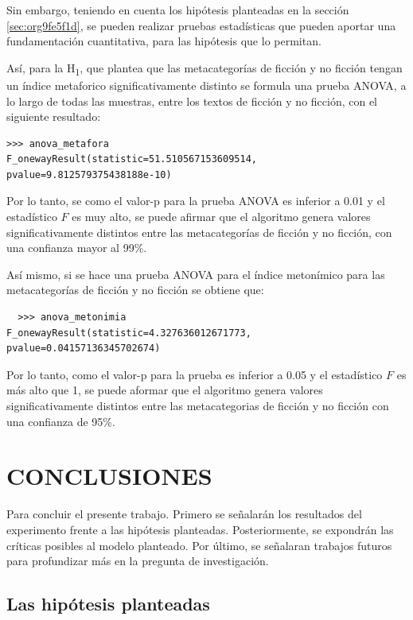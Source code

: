 \documentclass[12pt,letterpaper,twoside]{article}
\begin{document}
Sin embargo, teniendo en cuenta los hipótesis planteadas en la sección \ref{sec:org9fe5f1d},
se pueden realizar pruebas estadísticas que pueden aportar una fundamentación cuantitativa,
para las hipótesis que lo permitan.

Así, para la H\textsubscript{1}, que plantea que las metacategorías de ficción y no ficción tengan un
índice metaforico significativamente distinto se formula una prueba ANOVA, a lo largo de
todas las muestras, entre los textos de ficción y no ficción, con el siguiente resultado:

\begin{verbatim}
>>> anova_metafora
F_onewayResult(statistic=51.510567153609514, pvalue=9.812579375438188e-10)

\end{verbatim}

Por lo tanto, se como el valor-p para la prueba ANOVA es inferior a 0.01 y
el estadístico \(F\) es muy alto, se puede afirmar que el algoritmo genera valores
significativamente distintos entre las metacategorías de ficción y no ficción,
con una confianza mayor al 99\%.

Así mismo, si se hace una prueba ANOVA para el índice metonímico para las
metacategorías de ficción y no ficción se obtiene que:


\begin{verbatim}
  >>> anova_metonimia
F_onewayResult(statistic=4.327636012671773, pvalue=0.04157136345702674)

\end{verbatim}

Por lo tanto, como el valor-p para la prueba es inferior a 0.05 y el estadístico
\(F\) es más alto que 1, se puede aformar que el algoritmo genera valores
significativamente distintos entre las metacategorias de ficción y no ficción
con una confianza de 95\%.


\section{CONCLUSIONES}
\label{sec:org567a314}

Para concluir el presente trabajo. Primero se señalarán los
resultados del experimento frente a las hipótesis planteadas.
Posteriormente, se expondrán las críticas posibles al modelo
planteado. Por último, se señalaran trabajos futuros para profundizar
más en la pregunta de investigación.

\subsection{Las hipótesis planteadas}
\label{sec:org872d228}
\end{document}
